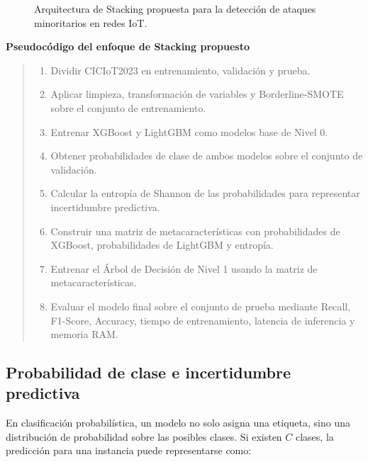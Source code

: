 \documentclass[12pt,a4paper]{article}
\begin{document}
\begin{figure}[H]
{
}
\caption{Arquitectura de Stacking propuesta para la detección de ataques minoritarios en redes IoT.}
\end{figure}

\noindent\textbf{Pseudocódigo del enfoque de Stacking propuesto}

\begin{quote}
\small
\begin{enumerate}
    \item Dividir CICIoT2023 en entrenamiento, validación y prueba.
    \item Aplicar limpieza, transformación de variables y Borderline-SMOTE sobre el conjunto de entrenamiento.
    \item Entrenar XGBoost y LightGBM como modelos base de Nivel 0.
    \item Obtener probabilidades de clase de ambos modelos sobre el conjunto de validación.
    \item Calcular la entropía de Shannon de las probabilidades para representar incertidumbre predictiva.
    \item Construir una matriz de metacaracterísticas con probabilidades de XGBoost, probabilidades de LightGBM y entropía.
    \item Entrenar el Árbol de Decisión de Nivel 1 usando la matriz de metacaracterísticas.
    \item Evaluar el modelo final sobre el conjunto de prueba mediante Recall, F1-Score, Accuracy, tiempo de entrenamiento, latencia de inferencia y memoria RAM.
\end{enumerate}
\end{quote}

\subsection{Probabilidad de clase e incertidumbre predictiva}

En clasificación probabilística, un modelo no solo asigna una etiqueta, sino una distribución de probabilidad sobre las posibles clases. Si existen $C$ clases, la predicción para una instancia puede representarse como:
\end{document}
